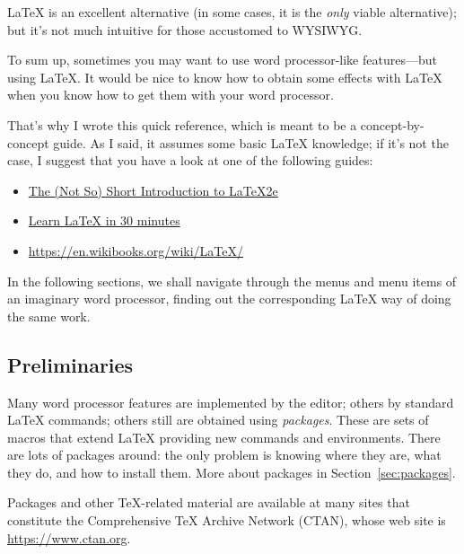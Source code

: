 \documentclass[a4paper,11pt]{article}
\begin{document}
\LaTeX{} is an excellent alternative (in some cases, it is the
\emph{only} viable alternative); but it's not much intuitive for those
accustomed to WYSIWYG.

To sum up, sometimes you may want to use word processor-like
features---but using \LaTeX. It would be nice to know how to obtain
some effects with \LaTeX{} when you know how to get them with your
word processor.

That's why I wrote this quick reference, which is meant to be a
concept-by-concept guide.  As I said, it assumes some basic \LaTeX{}
knowledge; if it's not the case, I suggest that you have a look at one of
the following guides:

\begin{itemize}

\item \href{https://www.ctan.org/tex-archive/info/lshort/}{The
(Not So) Short Introduction to \LaTeX2e{}}

\item \href{https://www.overleaf.com/learn/latex/Learn_LaTeX_in_30_minutes}
{Learn LaTeX in 30 minutes}

\item \url{https://en.wikibooks.org/wiki/LaTeX/}

\end{itemize}

In the following sections, we shall navigate through the menus and
menu items of an imaginary word processor, finding out the
corresponding \LaTeX{} way of doing the same work.



\subsection{Preliminaries}

Many word processor features are implemented by the editor; others by
standard \LaTeX{} commands; others still are obtained using
\emph{packages}. These are sets of macros that extend \LaTeX{}
providing new commands and environments. There are lots of packages
around: the only problem is knowing where they are, what they do, and
how to install them. More about packages in
Section~\ref{sec:packages}.

Packages and other \TeX{}-related material are available at many sites
that constitute the Comprehensive TeX Archive Network (CTAN), whose
web site is \url{https://www.ctan.org}.
\end{document}
